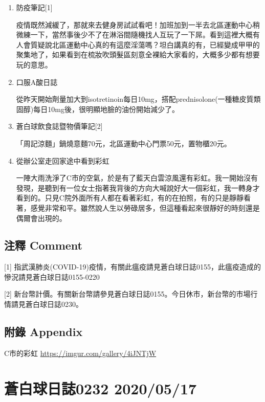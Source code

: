 \documentclass[a5paper, 11pt
]{book}
\begin{document}
\begin{enumerate}
\def\labelenumi{\arabic{enumi}.}
\item
  防疫筆記{[}1{]}

  疫情既然減緩了，那就來去健身房試試看吧！加班加到一半去北區運動中心稍微練一下，當然事後少不了在淋浴間隨機找人互玩了一下屌。看到這裡大概有人會質疑說北區運動中心真的有這麼淫蕩嗎？坦白講真的有，已經變成甲甲的聚集地了，如果看到在梳妝吹頭髮區刻意全裸給大家看的，大概多少都有想要玩的意思。
\item
  口服A酸日誌

  從昨天開始劑量加大到isotretinoin每日10mg，搭配prednisolone(一種糖皮質類固醇)每日10mg後，很明顯地臉的油份開始減少了。
\item
  蒼白球飲食誌暨物價筆記{[}2{]}

  「周記涼麵」鍋燒意麵70元，北區運動中心門票50元，置物櫃20元。
\item
  從辦公室走回家途中看到彩虹

  一陣大雨洗淨了C市的空氣，於是有了藍天白雲涼風還有彩虹。我一開始沒有發現，是聽到有一位女士指著我背後的方向大喊說好大一個彩虹，我一轉身才看到的。只見C院外面所有人都在看著彩虹，有的在拍照，有的只是靜靜看著，感覺非常和平。雖然說人生以勞碌居多，但這種看起來很靜好的時刻還是偶爾會出現的。
\end{enumerate}

\hypertarget{ux6ce8ux91cb-comment-76}{%
\subsection{注釋 Comment}\label{ux6ce8ux91cb-comment-76}}

{[}1{]}
指武漢肺炎(COVID-19)疫情，有關此瘟疫請見蒼白球日誌0155，此瘟疫造成的慘況請見蒼白球日誌0155-0220

{[}2{]}
新台幣計價。有關新台幣請參見蒼白球日誌0155。今日休市，新台幣的市場行情請見蒼白球日誌0230。

\hypertarget{ux9644ux9304-appendix-76}{%
\subsection{附錄 Appendix}\label{ux9644ux9304-appendix-76}}

C市的彩虹 \url{https://imgur.com/gallery/4iJNTjW}

\hypertarget{ux84bcux767dux7403ux65e5ux8a8c0232-20200517}{%
\section{蒼白球日誌0232
2020/05/17}\label{ux84bcux767dux7403ux65e5ux8a8c0232-20200517}}
\end{document}
